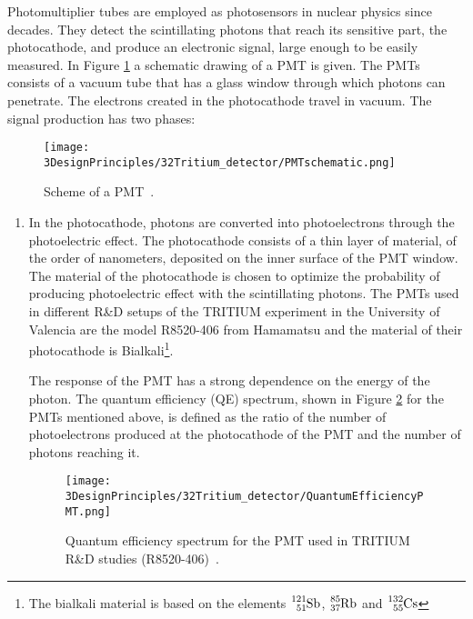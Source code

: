 Photomultiplier tubes are employed as photosensors in nuclear physics since decades. They detect the scintillating photons that reach its sensitive part, the photocathode, and produce an electronic signal, large enough to be easily measured. In Figure \ref{fig:SchemePMT} a schematic drawing of a PMT is given. The PMTs consists of a vacuum tube that has a glass window through which photons can penetrate. The electrons created in the photocathode travel in vacuum. The signal production has two phases:

\begin{figure}[htbp]
\centering
\texttt{[image: 3DesignPrinciples/32Tritium\_detector/PMTschematic.png]}
\caption{Scheme of a PMT\label{fig:SchemePMT}~\cite{Knoll}.}
\end{figure}

\begin{enumerate}
\item{} In the photocathode, photons are converted into photoelectrons through the photoelectric effect. The photocathode consists of a thin layer of material, of the order of nanometers, deposited on the inner surface of the PMT window. The material of the photocathode is chosen to optimize the probability of producing photoelectric effect with the scintillating photons. The PMTs used in different R\&D setups of the TRITIUM experiment in the University of Valencia are the model R8520-406 from Hamamatsu \cite{DataSheetPMTs} and the material of their photocathode is Bialkali\footnote{The bialkali material is based on the elements $\ce{^{121}_{51}Sb}$, $\ce{^{85}_{37}Rb}$ and $\ce{^{132}_{55}Cs}$}.


The response of the PMT has a strong dependence on the energy of the photon. The quantum efficiency (QE)  spectrum, shown in Figure \ref{fig:QuantumEfficiencyPMT} for the PMTs mentioned above, is defined as the ratio of the number of photoelectrons produced at the photocathode of the PMT and the number of photons reaching it.

\begin{figure}[htbp]
\centering
\texttt{[image: 3DesignPrinciples/32Tritium\_detector/QuantumEfficiencyPMT.png]}
\caption{Quantum efficiency spectrum for the PMT used in TRITIUM R\&D studies (R8520-406)\label{fig:QuantumEfficiencyPMT}~\cite{DataSheetPMTs}.}
\end{figure}


\end{enumerate}
